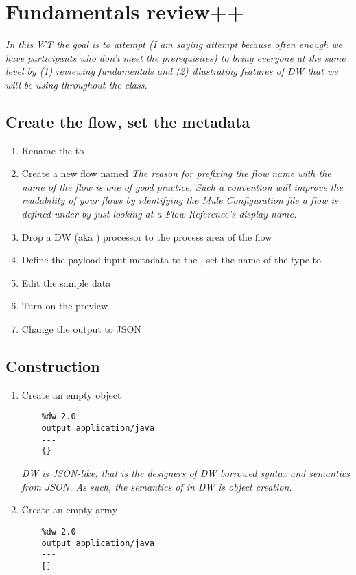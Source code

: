 \section{Fundamentals review++}
\emph{
  In this WT the goal is to attempt (I am saying attempt because often enough we have participants who don’t meet the prerequisites) to bring everyone at the same level by (1) reviewing fundamentals and (2) illustrating features of DW that we will be using throughout the class.
}

\subsection{Create the flow, set the metadata}
\begin{enumerate}
\item Rename the  to 
\item Create a new flow named 
  \newline
  \emph{
    The reason for prefixing the flow name with the name of the flow is one of good practice.
    Such a convention will improve the readability of your flows by identifying the
    Mule Configuration file a flow is defined under by just looking at a Flow Reference's
    display name.
  }
\item Drop a DW (aka ) processor to the process area of the flow
\item Define the payload input metadata to the ,
  set the name of the type to 
\item Edit the sample data
\item Turn on the preview
\item Change the output to JSON
\end{enumerate}

\subsection{Construction}
\begin{enumerate}[resume*]
\item Create an empty object
  \begin{lstlisting}
    %dw 2.0
    output application/java
    ---
    {}
  \end{lstlisting}
  \emph{
    DW is JSON-like, that is the designers of DW borrowed syntax and semantics from JSON.  As such, the semantics of \ttt{{}} in DW is object creation.   
  }
\item Create an empty array
  \begin{lstlisting}
    %dw 2.0
    output application/java
    ---
    []
  \end{lstlisting}
\end{enumerate}

